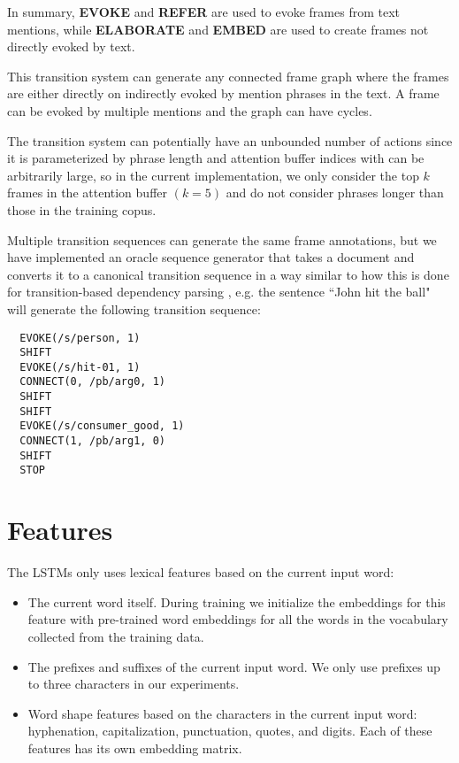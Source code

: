 \documentclass[11pt,a4paper]{article}
\begin{document}
In summary, {\bf EVOKE} and {\bf REFER} are used to evoke frames from text
mentions, while {\bf ELABORATE} and {\bf EMBED} are used to create frames not
directly evoked by text.

This transition system can generate any connected frame graph where the frames
are either directly on indirectly evoked by mention phrases in the text. A frame
can be evoked by multiple mentions and the graph can have cycles.

The transition system can potentially have an unbounded number of actions since
it is parameterized by phrase length and attention buffer indices with can be
arbitrarily large, so in the current implementation, we only consider the
top $k$ frames in the attention buffer $(k=5)$ and do not consider phrases
longer than those in the training copus.

Multiple transition sequences can generate the same frame annotations, but we
have implemented an oracle sequence generator that takes a document and converts
it to a canonical transition sequence in a way similar to how this is done
for transition-based dependency parsing \cite{nivre2006}, e.g. the sentence
``John hit the ball" will generate the following transition sequence:
\begin{verbatim}
  EVOKE(/s/person, 1)
  SHIFT
  EVOKE(/s/hit-01, 1)
  CONNECT(0, /pb/arg0, 1)
  SHIFT
  SHIFT
  EVOKE(/s/consumer_good, 1)
  CONNECT(1, /pb/arg1, 0)
  SHIFT
  STOP
\end{verbatim}

\section{Features}
\label{sec:features}

The LSTMs only uses lexical features based on the current input word:

\begin{itemize}
  \item The current word itself. During training we initialize the embeddings
  for this feature with pre-trained word embeddings \cite{mikolov2013} for all
  the words in the vocabulary collected from the training data.
  \item The prefixes and suffixes of the current input word. We only use
  prefixes up to three characters in our experiments.
  \item Word shape features based on the characters in the current input word:
  hyphenation, capitalization, punctuation, quotes, and digits. Each of these
  features has its own embedding matrix.
\end{itemize}
\end{document}
